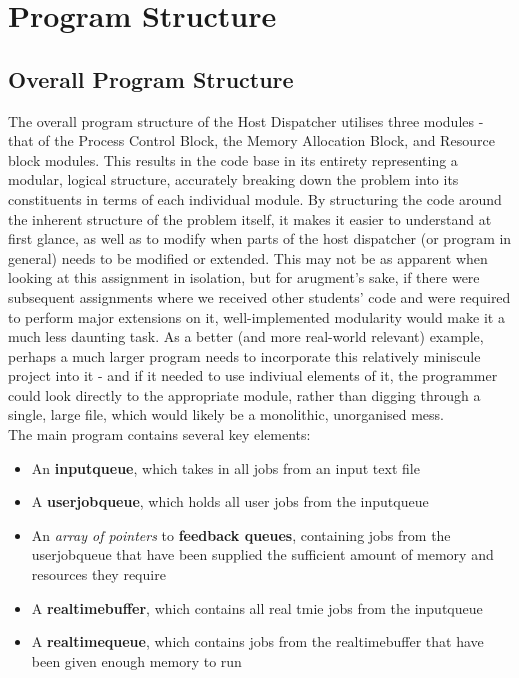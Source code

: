 \documentclass[11pt]{article}
\begin{document}
\pagebreak
\section{Program Structure}

\iffalse
(12 marks + 3 bonus)
(Provides comprehensive description of overall program structure, its modules, and major functions)
(Provides detailed and clear justification of program structure in context of assignment)

c. Describe and discuss the overall structure of your program, describing the
various modules and major functions (description of the function interfaces are
expected)
\fi

\subsection{Overall Program Structure}
The overall program structure of the Host Dispatcher utilises three modules - that of the Process Control Block, the Memory Allocation Block, and Resource block modules. This results in the code base in its entirety representing a modular, logical structure, accurately breaking down the problem into its constituents in terms of each individual module. By structuring the code around the inherent structure of the problem itself, it makes it easier to understand at first glance, as well as to modify when parts of the host dispatcher (or program in general) needs to be modified or extended. This may not be as apparent when looking at this assignment in isolation, but for arugment's sake, if there were subsequent assignments where we received other students' code and were required to perform major extensions on it, well-implemented modularity would make it a much less daunting task. As a better (and more real-world relevant) example, perhaps a much larger program needs to incorporate this relatively miniscule project into it - and if it needed to use indiviual elements of it, the programmer could look directly to the appropriate module, rather than digging through a single, large file, which would likely be a monolithic, unorganised mess.\\

The main program contains several key elements:
\begin{itemize}
\item An \textbf{inputqueue}, which takes in all jobs from an input text file
\item A \textbf{userjobqueue}, which holds all user jobs from the inputqueue
\item An \textit{array of pointers} to \textbf{feedback queues}, containing jobs from the userjobqueue that have been supplied the sufficient amount of memory and resources they require
\item A \textbf{realtimebuffer}, which contains all real tmie jobs from the inputqueue
\item A \textbf{realtimequeue}, which contains jobs from the realtimebuffer that have been given enough memory to run
\end{itemize}
\end{document}
